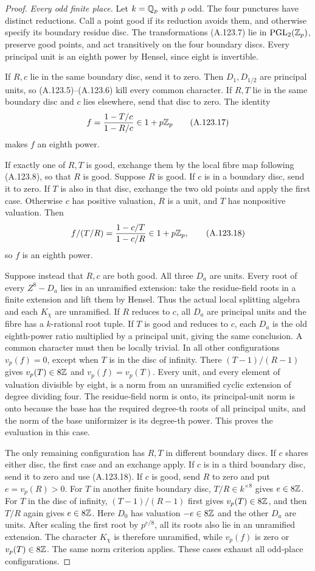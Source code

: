 \begin{proof}
\emph{Every odd finite place.}
Let $k=\mathbb Q_p$ with $p$ odd.
The four punctures have distinct reductions.
Call a point good if its reduction avoids them,
and otherwise specify its boundary residue disc.
The transformations (A.123.7) lie in
$\operatorname{PGL}_2(\mathbb Z_p)$, preserve good points,
and act transitively on the four boundary discs.
Every principal unit is an eighth power by Hensel,
since eight is invertible.

If $R,c$ lie in the same boundary disc, send it to
zero.
Then $D_1,D_{1/2}$ are principal units, so
(A.123.5)--(A.123.6) kill every common character.
If $R,T$ lie in the same boundary disc and $c$
lies elsewhere, send that disc to zero.
The identity
\[
                  f=\frac{1-T/c}{1-R/c}\in1+p\mathbb Z_p
\tag{A.123.17}
\]
makes $f$ an eighth power.

If exactly one of $R,T$ is good, exchange them
by the local fibre map following (A.123.8), so
that $R$ is good.
Suppose $R$ is good.
If $c$ is in a boundary disc, send it to zero.
If $T$ is also in that disc, exchange the two old
points and apply the first case.
Otherwise $c$ has positive valuation, $R$ is a
unit, and $T$ has nonpositive valuation.
Then
\[
                    f/(T/R)=\frac{1-c/T}{1-c/R}
                                      \in1+p\mathbb Z_p,
\tag{A.123.18}
\]
so $f$ is an eighth power.

Suppose instead that $R,c$ are both good.
All three $D_a$ are units.
Every root of every $Z^8-D_a$ lies in an
unramified extension: take the residue-field
roots in a finite extension and lift them by
Hensel.
Thus the actual local splitting algebra and
each $K_\chi$ are unramified.
If $R$ reduces to $c$, all $D_a$ are principal
units and the fibre has a $k$-rational root tuple.
If $T$ is good and reduces to $c$, each $D_a$
is the old eighth-power ratio multiplied by a
principal unit, giving the same conclusion.
A common character must then be locally trivial.
In all other configurations $v_p(f)=0$, except
when $T$ is in the disc of infinity.
There $(T-1)/(R-1)$ gives $v_p(T)\in8\mathbb Z$ and
$v_p(f)=v_p(T)$.
Every unit, and every element of valuation
divisible by eight, is a norm from an unramified
cyclic extension of degree dividing four.
The residue-field norm is onto, its principal-unit
norm is onto because the base has the required
degree-th roots of all principal units, and the
norm of the base uniformizer is its degree-th
power.
This proves the evaluation in this case.

The only remaining configuration has $R,T$ in
different boundary discs.
If $c$ shares either disc, the first case and
an exchange apply.
If $c$ is in a third boundary disc, send it to
zero and use (A.123.18).
If $c$ is good, send $R$ to zero and put
$e=v_p(R)>0$.
For $T$ in another finite boundary disc,
$T/R\in k^{\times8}$ gives $e\in8\mathbb Z$.
For $T$ in the disc of infinity,
$(T-1)/(R-1)$ first gives $v_p(T)\in8\mathbb Z$,
and then $T/R$ again gives $e\in8\mathbb Z$.
Here $D_0$ has valuation $-e\in8\mathbb Z$ and the
other $D_a$ are units.
After scaling the first root by $p^{e/8}$,
all its roots also lie in an unramified extension.
The character $K_\chi$ is therefore unramified,
while $v_p(f)$ is zero or $v_p(T)\in8\mathbb Z$.
The same norm criterion applies.
These cases exhaust all odd-place configurations.


\end{proof}
